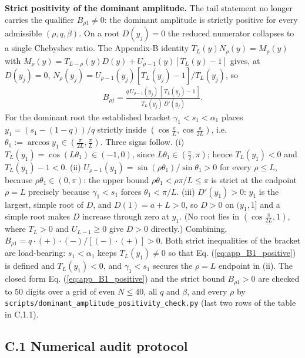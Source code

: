 \documentclass[superscriptaddress, amsmath, amssymb, aps, pre, floatfix]{revtex4-2}
\begin{document}
\medskip
\noindent\textbf{Strict positivity of the dominant amplitude.}
The tail statement no longer carries the qualifier \(B_{\rho1}\neq0\): the dominant amplitude is strictly positive for every admissible \((\rho,q,\beta)\).  On a root \(D(y_j)=0\) the reduced numerator collapses to a single Chebyshev ratio.  The Appendix-B identity \(T_L(y)N_\rho(y)=M_\rho(y)\) with \(M_\rho(y)=T_{L-\rho}(y)D(y)+U_{\rho-1}(y)[T_L(y)-1]\) gives, at \(D(y_j)=0\), \(N_\rho(y_j)=U_{\rho-1}(y_j)[T_L(y_j)-1]/T_L(y_j)\), so
\begin{align}
  B_{\rho j}=\frac{q\,U_{\rho-1}(y_j)\,[\,T_L(y_j)-1\,]}{T_L(y_j)\,D'(y_j)}.
  \label{eq:app_B1_positive}
\end{align}
For the dominant root the established bracket \(\gamma_1<s_1<\alpha_1\) places \(y_1=(s_1-(1-q))/q\) strictly inside \((\cos\tfrac{\pi}{L},\cos\tfrac{\pi}{2L})\), i.e. \(\theta_1:=\arccos y_1\in(\tfrac{\pi}{2L},\tfrac{\pi}{L})\).  Three signs follow.
(i) \(T_L(y_1)=\cos(L\theta_1)\in(-1,0)\), since \(L\theta_1\in(\tfrac{\pi}{2},\pi)\); hence \(T_L(y_1)<0\) and \(T_L(y_1)-1<0\).
(ii) \(U_{\rho-1}(y_1)=\sin(\rho\theta_1)/\sin\theta_1>0\) for every \(\rho\le L\), because \(\rho\theta_1\in(0,\pi)\): the upper bound \(\rho\theta_1<\rho\pi/L\le\pi\) is strict at the endpoint \(\rho=L\) precisely because \(\gamma_1<s_1\) forces \(\theta_1<\pi/L\).
(iii) \(D'(y_1)>0\): \(y_1\) is the largest, simple root of \(D\), and \(D(1)=a+L>0\), so \(D>0\) on \((y_1,1]\) and a simple root makes \(D\) increase through zero at \(y_1\).  (No root lies in \((\cos\tfrac{\pi}{2L},1)\), where \(T_L>0\) and \(U_{L-1}\ge0\) give \(D>0\) directly.)
Combining, \(B_{\rho1}=q\cdot(+)\cdot(-)/[(-)\cdot(+)]>0\).  Both strict inequalities of the bracket are load-bearing: \(s_1<\alpha_1\) keeps \(T_L(y_1)\neq0\) so that Eq. (\ref{eq:app_B1_positive}) is defined and \(T_L(y_1)<0\), and \(\gamma_1<s_1\) secures the \(\rho=L\) endpoint in (ii).  The closed form Eq. (\ref{eq:app_B1_positive}) and the strict bound \(B_{\rho1}>0\) are checked to \(50\) digits over a grid of even \(N\le40\), all \(q\) and \(\beta\), and every \(\rho\) by \texttt{scripts/dominant\_amplitude\_positivity\_check.py} (last two rows of the table in C.1.1).

\subsection*{C.1 Numerical audit protocol}
\end{document}
